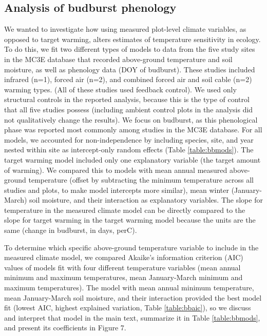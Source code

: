 \documentclass{article}
\begin{document}
\subsection* {Analysis of budburst phenology}
We wanted to investigate how using measured plot-level climate variables, as opposed to target warming, alters estimates of temperature sensitivity in ecology. To do this, we fit two different types of models to data from the five study sites in the MC3E database that recorded above-ground temperature and soil moisture, as well as phenology data (DOY of budburst). These studies included infrared (n=1), forced air (n=2), and combined forced air and soil cable (n=2) warming types. (All of these studies used feedback control). We used only structural controls in the reported analysis, because this is the type of control that all five studies possess (including ambient control plots in the analysis did not qualitatively change the results). We focus on budburst, as this phenological phase was reported most commonly among studies in the MC3E database. For all models, we accounted for non-independence by including species, site, and year nested within site as intercept-only random effects (Table \ref{table:bbmods}). The target warming model included only one explanatory variable (the target amount of warming).  We compared this to models with mean annual measured above-ground temperature (offset by subtracting the minimum temperature across all studies and plots, to make model intercepts more similar), mean winter (January-March) soil moisture, and their interaction as explanatory variables. The slope for temperature in the measured climate model can be directly compared to the slope for target warming in the target warming model because the units are the same (change in budburst, in days, per\degree C).
\par To determine which specific above-ground temperature variable to include in the measured climate model, we compared Akaike's information criterion (AIC) values of models fit with four different temperature variables (mean annual minimum and maximum temperatures, mean January-March minimum and maximum temperatures). The model with mean annual minimum temperature, mean January-March soil moisture, and their interaction provided the best model fit (lowest AIC, highest explained variation, Table \ref{table:bbaic}), so we discuss and interpret that model in the main text, summarize it in Table \ref{table:bbmods}, and present its coefficients in Figure 7. 


\clearpage
\end{document}
